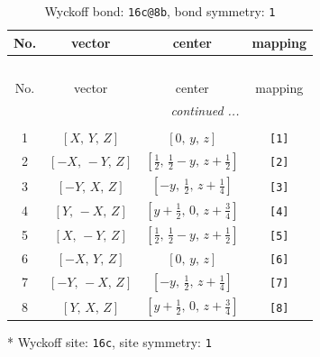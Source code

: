 \documentclass[fleqn,8pt]{jsarticle}
\begin{document}
\renewcommand{\arraystretch}{1.2}
\begin{longtable}{cccc}
\caption{Wyckoff bond: {\tt 16c@8b}, bond symmetry: {\tt 1}}
 \\
 \hline \hline
No. & vector & center & mapping \\ \hline \endfirsthead

\multicolumn{3}{l}{\tablename\ \thetable{}} \\
 \hline \hline
No. & vector & center & mapping \\ \hline \endhead

 \hline \hline
\multicolumn{3}{r}{\footnotesize\it continued ...} \\ \endfoot

 \hline \hline
\multicolumn{3}{r}{} \\ \endlastfoot

1 & $\left[ X,\, Y,\, Z \right]$ & $\left[ 0,\, y,\, z \right]$ & {\tt [1]} \\ \hline
2 & $\left[ - X,\, - Y,\, Z \right]$ & $\left[ \frac{1}{2},\, \frac{1}{2} - y,\, z + \frac{1}{2} \right]$ & {\tt [2]} \\ \hline
3 & $\left[ - Y,\, X,\, Z \right]$ & $\left[ - y,\, \frac{1}{2},\, z + \frac{1}{4} \right]$ & {\tt [3]} \\ \hline
4 & $\left[ Y,\, - X,\, Z \right]$ & $\left[ y + \frac{1}{2},\, 0,\, z + \frac{3}{4} \right]$ & {\tt [4]} \\ \hline
5 & $\left[ X,\, - Y,\, Z \right]$ & $\left[ \frac{1}{2},\, \frac{1}{2} - y,\, z + \frac{1}{2} \right]$ & {\tt [5]} \\ \hline
6 & $\left[ - X,\, Y,\, Z \right]$ & $\left[ 0,\, y,\, z \right]$ & {\tt [6]} \\ \hline
7 & $\left[ - Y,\, - X,\, Z \right]$ & $\left[ - y,\, \frac{1}{2},\, z + \frac{1}{4} \right]$ & {\tt [7]} \\ \hline
8 & $\left[ Y,\, X,\, Z \right]$ & $\left[ y + \frac{1}{2},\, 0,\, z + \frac{3}{4} \right]$ & {\tt [8]} \\
\end{longtable}
* Wyckoff site: {\tt 16c}, site symmetry: {\tt 1}
\renewcommand{\arraystretch}{1.2}
\end{document}
